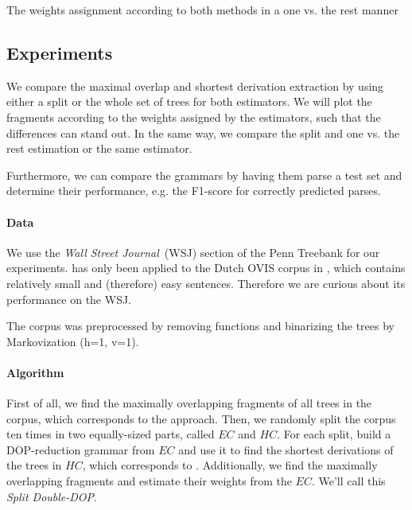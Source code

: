 \begin{table}[h!]
\center

\caption{The weights assignment according to both methods in a one vs. the rest manner}
\label{t:weights}
\end{table}





\subsection{Experiments}





We compare the maximal overlap and shortest derivation extraction by using either a split or the whole set of trees for both estimators. We will plot the fragments according to the weights assigned by the estimators, such that the differences can stand out. In the same way, we compare the split and one vs. the rest estimation or the same estimator.

Furthermore, we can compare the grammars by having them parse a test set and determine their performance, e.g. the F1-score for correctly predicted parses.

\paragraph{Data}
We use the \emph{Wall Street Journal}~(WSJ) section of the Penn Treebank for our experiments. \dops{} has only been applied to the Dutch OVIS corpus in \cite{zollmann2005}, which contains relatively small and (therefore) easy sentences. Therefore we are curious about its performance on the WSJ.

The corpus was preprocessed by removing functions and binarizing the trees by Markovization (h=1, v=1). 

\paragraph{Algorithm}
First of all, we find the maximally overlapping fragments of all trees in the corpus, which corresponds to the \ddop{} approach.
Then, we randomly split the corpus ten times in two equally-sized parts, called $EC$ and $HC$. For each split, build a DOP-reduction grammar from $EC$ and use it to find the shortest derivations of the trees in $HC$, which corresponds to \dops{}. Additionally, we find the maximally overlapping fragments and estimate their weights from the $EC$. We'll call this \emph{Split Double-DOP}.


